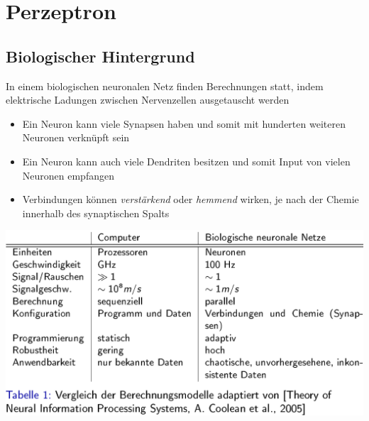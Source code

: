 \documentclass{report}
\begin{document}
\section{Perzeptron}
\subsection{Biologischer Hintergrund}
In einem biologischen neuronalen Netz finden Berechnungen statt, indem elektrische Ladungen zwischen Nervenzellen ausgetauscht werden\\
\vspace*{-1.25em}
\begin{itemize}
  \item Ein Neuron kann viele Synapsen haben und somit mit hunderten weiteren Neuronen verknüpft sein
  \item Ein Neuron kann auch viele Dendriten besitzen und somit Input von vielen Neuronen empfangen
  \item Verbindungen können \textit{verstärkend} oder \textit{hemmend} wirken, je nach der Chemie innerhalb des synaptischen Spalts
\end{itemize}
\begin{center}
  \includegraphics[scale=.2275]{ml04_3}
\end{center}
\end{document}
